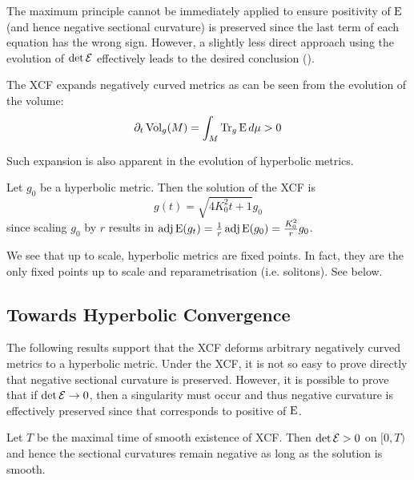 \documentclass[a4paper,12pt]{amsart}
\begin{document}
The maximum principle cannot be immediately applied to ensure positivity of \(\operatorname{E}\) (and hence negative sectional curvature) is preserved since the last term of each equation has the wrong sign. However, a slightly less direct approach using the evolution of \(\det \operatorname{\mathcal{E}}\) effectively leads to the desired conclusion ().

The XCF expands negatively curved metrics as can be seen from the evolution of the volume:
\begin{equation}
\label{eq:dtvol}
\partial_t \operatorname{Vol}_g (M) = \int_M \operatorname{Tr}_g \operatorname{E} d\mu > 0
\end{equation}

Such expansion is also apparent in the evolution of hyperbolic metrics.
\begin{example}
\label{eq:hyperbolic}

Let \(g_0\) be a hyperbolic metric. Then the solution of the XCF is
\[
g(t) = \sqrt{4K_0^2 t + 1} g_0
\]
since scaling \(g_0\) by \(r\) results in \(\operatorname{adj}\operatorname{E}(g_t) = \frac{1}{r} \operatorname{adj}\operatorname{E}(g_0) = \frac{K_0^2}{r} g_0\).
\end{example}

We see that up to scale, hyperbolic metrics are fixed points. In fact, they are the only fixed points up to scale and reparametrisation (i.e. solitons). See  below.

\subsection{Towards Hyperbolic Convergence}
\label{subsec:xcf_hyperbolic_convergence}

The following results support  that the XCF deforms arbitrary negatively curved metrics to a hyperbolic metric. Under the XCF, it is not so easy to prove directly that negative sectional curvature is preserved. However, it is possible to prove that if \(\det \operatorname{\mathcal{E}} \to 0\), then a singularity must occur and thus negative curvature is effectively preserved since that corresponds to positive of \(\operatorname{E}\).

\begin{prop}[{\cite[p. 8]{MR2055396}}]
\label{prop:negative_perserved}

Let $T$ be the maximal time of smooth existence of XCF. Then \(\det \operatorname{\mathcal{E}} > 0\) on \([0, T)\) and hence the sectional curvatures remain negative as long as the solution is smooth.
\end{prop}
\end{document}
